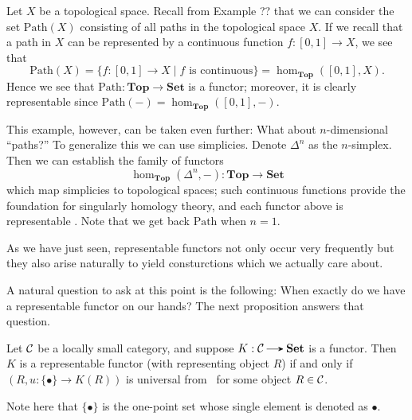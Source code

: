     \begin{example}
        Let $X$ be a topological space. Recall from Example ?? that we can consider the 
        set $\text{Path}(X)$ consisting of all paths in the topological space $X$. 
        If we recall that a path in $X$ can be represented by 
        a continuous function $f: [0,1] \to X$, we see that 
        \[
            \text{Path}(X) = \{f:[0,1] \to X \mid f \text{ is continuous}\} = \hom_{\textbf{Top}}([0,1], X).
        \]
        Hence we see that $\text{Path}: \textbf{Top} \to \textbf{Set}$ is a functor; 
        moreover, it is clearly representable since $\text{Path}(-) = \hom_{\textbf{Top}}([0,1], -)$. 

        This example, however, can be taken even further: What about $n$-dimensional 
        ``paths?'' To generalize this we can use simplicies. Denote $\Delta^n$ 
        as the $n$-simplex. Then we can establish the family of functors 
        \[
            \hom_{\textbf{Top}}(\Delta^n, -): \textbf{Top} \to \textbf{Set}
        \]
        which map simplicies to topological spaces; such continuous 
        functions provide  the foundation for singularly homology theory, 
        and each functor above is representable . Note that we get back $\text{Path}$ 
        when $n = 1$. 
    \end{example}

    As we have just seen, representable functors not only occur very frequently 
    but they also arise naturally to yield consturctions which we actually care about. 


    A natural question to ask at this point is the following: When exactly do we have a representable 
    functor on our hands? The next proposition answers that question.

    \begin{proposition}\label{proposition:representable_if_and_only_if}
        Let $\mathcal{C}$ be a locally small category, and suppose $K:
        \cc \to \textbf{Set}$ is a functor. Then $K$ is a representable functor (with representing object $R$) 
        if and only if 
        $(R, u: \{\bullet\} \to K(R))$ is universal from  \
        for some object $R \in \mathcal{C}$. 
    \end{proposition}

    Note here that $\{\bullet\}$ is the one-point set whose single element is denoted as $\bullet$.

